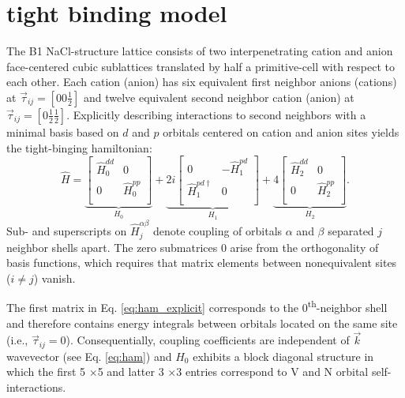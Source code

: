 \documentclass[twocolumn,showpacs,preprintnumbers,superscriptaddress,prb,floatfix,aps,10pt]{revtex4-1}
\newcommand*{\ham}{\hat{H}}
\newcommand*{\zeromat}{0}
\newcommand*{\x}{$\times$}
\begin{document}
\section{tight binding model}\label{appendix:tb}

The B1 NaCl-structure lattice consists of two interpenetrating cation and anion face-centered cubic sublattices translated by half a primitive-cell with respect to each other. Each cation (anion) has six equivalent first neighbor anions (cations) at $\vec{\tau}_{ij} = \left[0 0 \frac{1}{2}\right]$ and twelve equivalent second neighbor cation (anion) at $\vec{\tau}_{ij} = \left[0 \frac{1}{2} \frac{1}{2}\right]$. Explicitly describing interactions to second neighbors with a minimal basis based on $d$ and $p$ orbitals centered on cation and anion sites yields the tight-binging hamiltonian: 
\begin{equation}
\label{eq:ham_explicit}
\hat{H} = 
\underbrace{
\begin{bmatrix}
\hat{H}_0^{dd} & \zeromat \\
\zeromat & \hat{H}_0^{pp} \\
\end{bmatrix}}_{H_0}
 + 
\underbrace{
 2i
\begin{bmatrix}
\zeromat              & -\hat{H}_1^{pd} \\
\hat{H}_1^{pd\dagger} &  \zeromat        \\
\end{bmatrix}}_{H_1}
 + 
\underbrace{
 4
\begin{bmatrix}
\hat{H}_2^{dd} & \zeromat       \\
\zeromat       & \hat{H}_2^{pp} \\
\end{bmatrix}}_{H_2}.
\end{equation}
Sub- and superscripts on $\ham_{j}^{\alpha\beta}$ denote coupling of orbitals $\alpha$ and $\beta$ separated $j$ neighbor shells apart. The zero submatrices $\zeromat$ arise from the orthogonality of basis functions, which requires that matrix elements between nonequivalent sites ($i \neq j$) vanish.

The first matrix in Eq. \ref{eq:ham_explicit} corresponds to the $0$\textsuperscript{th}-neighbor shell and therefore contains energy integrals between orbitals located on the same site (i.e., $\vec{\tau}_{ij} = 0$). Consequentially, coupling coefficients are independent of $\vec{k}$ wavevector (see Eq. \ref{eq:ham}) and $H_0$ exhibits a block diagonal structure in which the first 5 \x 5 and latter 3 \x 3 entries correspond to V and N orbital self-interactions.
\end{document}
